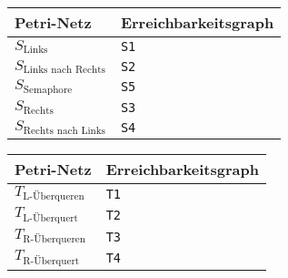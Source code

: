 \begin{enumerate}[label={Aufgabe H\arabic*},start=40]
\begin{enumerate}
                \begin{multicols}{2}
                    \begin{center}
                        \begin{tabular}[0.9\textwidth]{@{}ll@{}}
                            \toprule
                            Petri-Netz & Erreichbarkeitsgraph \\
                            \midrule
                            $S_\text{Links}$ & \texttt{S1} \\
                            $S_\text{Links nach Rechts}$ & \texttt{S2} \\
                            $S_\text{Semaphore}$ & \texttt{S5} \\
                            $S_\text{Rechts}$ & \texttt{S3} \\
                            $S_\text{Rechts nach Links}$ & \texttt{S4} \\
                            \bottomrule
                        \end{tabular}
                    \end{center}
                    \begin{center}
                        \begin{tabular}[0.9\textwidth]{@{}ll@{}}
                            \toprule
                            Petri-Netz & Erreichbarkeitsgraph \\
                            \midrule
                            $T_\text{L-Überqueren}$ & \texttt{T1} \\
                            $T_\text{L-Überquert}$ & \texttt{T2} \\
                            $T_\text{R-Überqueren}$ & \texttt{T3} \\
                            $T_\text{R-Überquert}$ & \texttt{T4} \\
                            \bottomrule
                        \end{tabular}
                    \end{center}
                \end{multicols}
                \pagebreak
                \begin{figure}[h!]
                    \centering
\end{figure}
\end{enumerate}
\end{enumerate}
